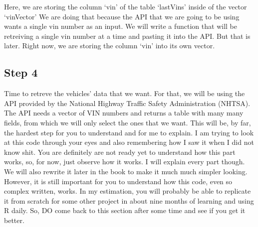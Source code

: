 \documentclass[]{book}
\newenvironment{Shaded}{\begin{snugshade}}{\end{snugshade}}
\newcommand{\CommentTok}[1]{\textcolor[rgb]{0.56,0.35,0.01}{\textit{#1}}}
\newcommand{\KeywordTok}[1]{\textcolor[rgb]{0.13,0.29,0.53}{\textbf{#1}}}
\newcommand{\NormalTok}[1]{#1}
\newcommand{\OperatorTok}[1]{\textcolor[rgb]{0.81,0.36,0.00}{\textbf{#1}}}
\newcommand{\StringTok}[1]{\textcolor[rgb]{0.31,0.60,0.02}{#1}}
\begin{document}
\begin{Shaded}
\end{Shaded}

Here, we are storing the column `vin' of the table `lastVins' inside of the vector `vinVector' We are doing that because the API that we are going to be using wants a single vin number as an input. We will write a function that will be retreiving a single vin number at a time and pasting it into the API. But that is later. Right now, we are storing the column `vin' into its own vector.

\begin{Shaded}
\end{Shaded}

\hypertarget{step-4-1}{%
\subsection{Step 4}\label{step-4-1}}

Time to retreve the vehicles' data that we want. For that, we will be using the API provided by the National Highway Traffic Safety Administration (NHTSA). The API needs a vector of VIN numbers and returns a table with many many fields, from which we will only select the ones that we want. This will be, by far, the hardest step for you to understand and for me to explain. I am trying to look at this code through your eyes and also remembering how I saw it when I did not know shit. You are definitely are not ready yet to understand how this part works, so, for now, just observe how it works. I will explain every part though. We will also rewrite it later in the book to make it much much simpler looking. However, it is still important for you to understand how this code, even so complex written, works. In my estimation, you will probably be able to replicate it from scratch for some other project in about nine months of learning and using R daily. So, DO come back to this section after some time and see if you get it better.
\end{document}
